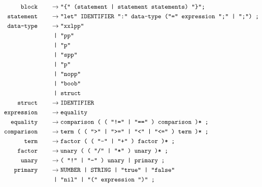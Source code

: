 \documentclass[12pt, a4paper]{article}
\newcommand{\ttt}[1]{
    \text{\texttt{#1}}
}
\newcommand{\ebnfnode}[2]{%
    #1\hspace{20px} &\to #2\\
}
\newcommand{\ebnfnodett}[2]{%
    \ebnfnode{\ttt{#1}}{\ttt{#2}}
}
\begin{document}
    \begin{align*}
        \ebnfnodett{block}{"\{" (statement | statement statements) "\}";}
        \ebnfnodett{statement}{"let" IDENTIFIER ":" data-type ("=" expression ";" | ";") ;}
        \ebnfnode{\ttt{data-type}}
        {%
            \ttt{"xxlpp"}\\
            &\ttt{ | "pp"}\\
            &\ttt{ | "p"}\\
            &\ttt{ | "spp"}\\
            &\ttt{ | "p"}\\
            &\ttt{ | "nopp"}\\
            &\ttt{ | "boob"}\\
            &\ttt{ | struct}
        }
        \ebnfnodett{struct}{IDENTIFIER}
        \ebnfnodett{expression}{equality}
        \ebnfnodett{equality}{comparison ( ( "!=" | "==" ) comparison )* ;}
        \ebnfnodett{comparison}{term ( ( ">" | ">=" | "<" | "<=" ) term )* ;}
        \ebnfnodett{term}{factor ( ( "-" | "+" ) factor )* ;}
        \ebnfnodett{factor}{unary ( ( "/" | "*" ) unary )* ;}
        \ebnfnodett{unary}{( "!" | "-" ) unary | primary ;}
        \ebnfnode{\ttt{primary}}{\ttt{NUMBER | STRING | "true" | "false"}\\&\ttt{ | "nil" | "(" expression ")" ;}}
    \end{align*}
\end{document}
